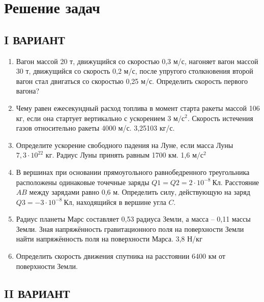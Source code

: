 \documentclass[a6paper, 11pt]{diss_4}
\renewcommand{\'}{\,'}
\begin{document}
\section{Решение задач}

\subsection{I ВАРИАНТ}

\begin{enumerate}

  \item Вагон  массой  20 т,  движущийся  со скоростью  0,3 м/с,  нагоняет  вагон  массой  30 т, движущийся со скорость 0,2 м/с, после упругого столкновения второй вагон стал двигаться  со скоростью 0,25 м/с. Определить скорость первого вагона?

  \item Чему равен ежесекундный расход топлива в момент старта ракеты массой 106 кг, если она стартует вертикально с ускорением 3 $м/с^2$. Скорость истечения газов относительно ракеты 4000 м/с. 3,25103 кг/с.

  \item Определите ускорение свободного падения на Луне, если масса Луны $7,3\cdot10^{22}$ кг. Радиус Луны принять равным 1700 км. 1,6 $м/с^2$

  \item В вершинах при основании прямоугольного равнобедренного треугольника расположены одинаковые точечные заряды $Q1=Q2=2\cdot10^{-8}\ Кл$. Расстояние $AB$ между зарядами равно 0,6 м. Определить силу, действующую на заряд $Q3=-3\cdot10^{-8}\ Кл$, находящийся в вершине угла $C$.

  \item Радиус планеты Марс составляет 0,53 радиуса Земли, а масса -- 0,11 массы Земли. Зная напряжённость гравитационного поля на поверхности Земли найти напряжённость поля на поверхности Марса. 3,8 Н/кг

  \item Определить скорость движения спутника на расстоянии 6400 км от поверхности Земли.

\end{enumerate}


\subsection{II ВАРИАНТ}
\end{document}
